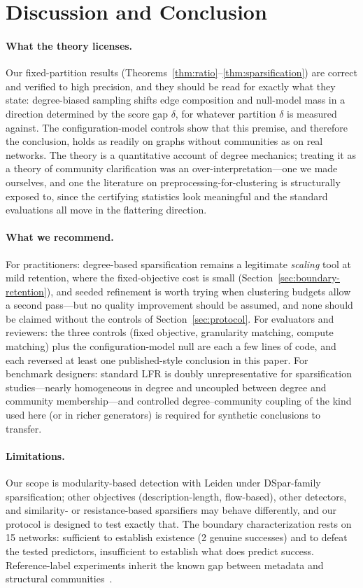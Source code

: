 \section{Discussion and Conclusion}
\label{sec:discussion}

\paragraph{What the theory licenses.}
Our fixed-partition results (Theorems~\ref{thm:ratio}--\ref{thm:sparsification}) are correct and verified to high precision, and they should be read for exactly what they state: degree-biased sampling shifts edge composition and null-model mass in a direction determined by the score gap $\delta$, for whatever partition $\delta$ is measured against.
The configuration-model controls show that this premise, and therefore the conclusion, holds as readily on graphs without communities as on real networks.
The theory is a quantitative account of degree mechanics; treating it as a theory of community clarification was an over-interpretation---one we made ourselves, and one the literature on preprocessing-for-clustering is structurally exposed to, since the certifying statistics look meaningful and the standard evaluations all move in the flattering direction.

\paragraph{What we recommend.}
For practitioners: degree-based sparsification remains a legitimate \emph{scaling} tool at mild retention, where the fixed-objective cost is small (Section~\ref{sec:boundary-retention}), and seeded refinement is worth trying when clustering budgets allow a second pass---but no quality improvement should be assumed, and none should be claimed without the controls of Section~\ref{sec:protocol}.
For evaluators and reviewers: the three controls (fixed objective, granularity matching, compute matching) plus the configuration-model null are each a few lines of code, and each reversed at least one published-style conclusion in this paper.
For benchmark designers: standard LFR is doubly unrepresentative for sparsification studies---nearly homogeneous in degree and uncoupled between degree and community membership---and controlled degree--community coupling of the kind used here (or in richer generators) is required for synthetic conclusions to transfer.

\paragraph{Limitations.}
Our scope is modularity-based detection with Leiden under DSpar-family sparsification; other objectives (description-length, flow-based), other detectors, and similarity- or resistance-based sparsifiers may behave differently, and our protocol is designed to test exactly that.
The boundary characterization rests on 15 networks: sufficient to establish existence (2 genuine successes) and to defeat the tested predictors, insufficient to establish what does predict success.
Reference-label experiments inherit the known gap between metadata and structural communities~\cite{peel2017ground, hric2014community}.

